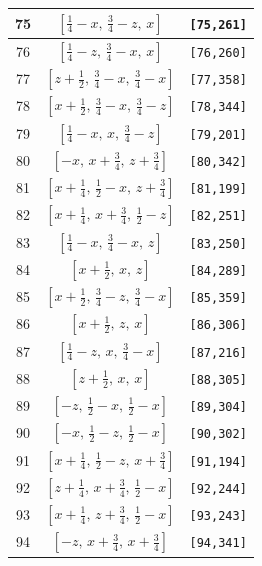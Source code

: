 \documentclass[fleqn,8pt]{jsarticle}
\begin{document}
\begin{longtable}{ccc}
75 & $\left[ \frac{1}{4} - x,\, \frac{3}{4} - z,\, x \right]$ & {\tt [75,261]} \\ \hline
76 & $\left[ \frac{1}{4} - z,\, \frac{3}{4} - x,\, x \right]$ & {\tt [76,260]} \\ \hline
77 & $\left[ z + \frac{1}{2},\, \frac{3}{4} - x,\, \frac{3}{4} - x \right]$ & {\tt [77,358]} \\ \hline
78 & $\left[ x + \frac{1}{2},\, \frac{3}{4} - x,\, \frac{3}{4} - z \right]$ & {\tt [78,344]} \\ \hline
79 & $\left[ \frac{1}{4} - x,\, x,\, \frac{3}{4} - z \right]$ & {\tt [79,201]} \\ \hline
80 & $\left[ - x,\, x + \frac{3}{4},\, z + \frac{3}{4} \right]$ & {\tt [80,342]} \\ \hline
81 & $\left[ x + \frac{1}{4},\, \frac{1}{2} - x,\, z + \frac{3}{4} \right]$ & {\tt [81,199]} \\ \hline
82 & $\left[ x + \frac{1}{4},\, x + \frac{3}{4},\, \frac{1}{2} - z \right]$ & {\tt [82,251]} \\ \hline
83 & $\left[ \frac{1}{4} - x,\, \frac{3}{4} - x,\, z \right]$ & {\tt [83,250]} \\ \hline
84 & $\left[ x + \frac{1}{2},\, x,\, z \right]$ & {\tt [84,289]} \\ \hline
85 & $\left[ x + \frac{1}{2},\, \frac{3}{4} - z,\, \frac{3}{4} - x \right]$ & {\tt [85,359]} \\ \hline
86 & $\left[ x + \frac{1}{2},\, z,\, x \right]$ & {\tt [86,306]} \\ \hline
87 & $\left[ \frac{1}{4} - z,\, x,\, \frac{3}{4} - x \right]$ & {\tt [87,216]} \\ \hline
88 & $\left[ z + \frac{1}{2},\, x,\, x \right]$ & {\tt [88,305]} \\ \hline
89 & $\left[ - z,\, \frac{1}{2} - x,\, \frac{1}{2} - x \right]$ & {\tt [89,304]} \\ \hline
90 & $\left[ - x,\, \frac{1}{2} - z,\, \frac{1}{2} - x \right]$ & {\tt [90,302]} \\ \hline
91 & $\left[ x + \frac{1}{4},\, \frac{1}{2} - z,\, x + \frac{3}{4} \right]$ & {\tt [91,194]} \\ \hline
92 & $\left[ z + \frac{1}{4},\, x + \frac{3}{4},\, \frac{1}{2} - x \right]$ & {\tt [92,244]} \\ \hline
93 & $\left[ x + \frac{1}{4},\, z + \frac{3}{4},\, \frac{1}{2} - x \right]$ & {\tt [93,243]} \\ \hline
94 & $\left[ - z,\, x + \frac{3}{4},\, x + \frac{3}{4} \right]$ & {\tt [94,341]} \\ \hline

\end{longtable}
\end{document}

